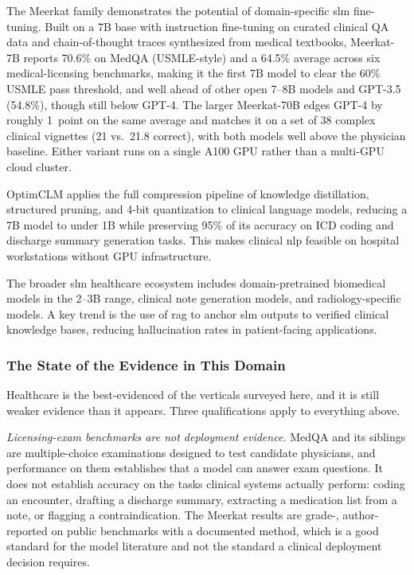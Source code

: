 The Meerkat family \citep{kim2025meerkat} demonstrates the potential of domain-specific \gls{slm} fine-tuning. Built on a 7B base with instruction fine-tuning on curated clinical QA data and chain-of-thought traces synthesized from medical textbooks, Meerkat-7B reports 70.6\% on MedQA (USMLE-style) and a 64.5\% average across six medical-licensing benchmarks, making it the first 7B model to clear the 60\% USMLE pass threshold, and well ahead of other open 7--8B models and GPT-3.5 (54.8\%), though still below GPT-4. The larger Meerkat-70B edges GPT-4 by roughly 1~point on the same average and matches it on a set of 38 complex clinical vignettes (21 vs.\ 21.8 correct), with both models well above the physician baseline. Either variant runs on a single A100 GPU rather than a multi-GPU cloud cluster.

OptimCLM \citep{hasan2024optimclm} applies the full compression pipeline of knowledge distillation, structured pruning, and 4-bit quantization to clinical language models, reducing a 7B model to under 1B while preserving 95\% of its accuracy on ICD coding and discharge summary generation tasks. This makes clinical \gls{nlp} feasible on hospital workstations without GPU infrastructure.

The broader \gls{slm} healthcare ecosystem includes domain-pretrained biomedical models in the 2--3B range, clinical note generation models, and radiology-specific models. A key trend is the use of \gls{rag} \citep{lewis2020rag} to anchor \gls{slm} outputs to verified clinical knowledge bases, reducing hallucination rates in patient-facing applications.

\subsubsection{The State of the Evidence in This Domain}
\label{subsubsec:applications_health_evidence}

Healthcare is the best-evidenced of the verticals surveyed here, and it is still
weaker evidence than it appears. Three qualifications apply to everything above.

\emph{Licensing-exam benchmarks are not deployment evidence.} MedQA and its
siblings are multiple-choice examinations designed to test candidate physicians,
and performance on them establishes that a model can answer exam questions. It
does not establish accuracy on the tasks clinical systems actually perform:
coding an encounter, drafting a discharge summary, extracting a medication list
from a note, or flagging a contraindication. The Meerkat results are
grade-\evC{}, author-reported on public benchmarks with a documented method,
which is a good standard for the model literature and not the standard a clinical
deployment decision requires.

